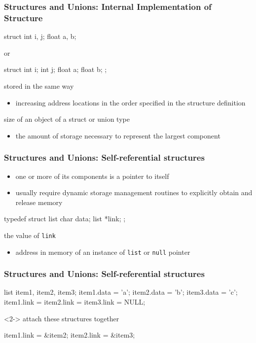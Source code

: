 \documentclass[newPxFont,sthlmFooter,nooffset]{beamer}
\begin{document}
\begin{frame}[t, fragile]
  \frametitle{Structures and Unions: {\large Internal Implementation of Structure}}
\begin{codedef}
struct {
    int i, j; float a, b;
}  
\end{codedef}

or 
\begin{codedef}
struct {
    int i; int j; float a; float b;
};
\end{codedef}
\bigskip
stored in the same way
\begin{itemize}
\item increasing address locations in the order specified in the
  structure definition
\end{itemize}

size of an object of a struct or union type
\begin{itemize}
\item the amount of storage necessary to represent the largest
  component
\end{itemize}

\end{frame}

\begin{frame}[t, fragile]
  \frametitle{Structures and Unions: {\large Self-referential structures}}
  \begin{itemize}
  \item one or more of its components is a pointer to itself
  \item usually require dynamic storage management routines to
    explicitly obtain and release memory
  \end{itemize}
\begin{codedef}
typedef struct list {
    char data;
    list *link;
};    
\end{codedef}
the value of \texttt{link}
\begin{itemize}
\item address in memory of an instance of \texttt{list} or \texttt{null} pointer
\end{itemize}
\end{frame}

\begin{frame}[t, fragile]
  \frametitle{Structures and Unions: {\large Self-referential structures}}
\begin{codedef}
list item1, item2, item3;
item1.data = 'a';
item2.data = 'b';
item3.data = 'c';
item1.link = item2.link = item3.link = NULL;   
\end{codedef}
\begin{uncoverenv}<2->
attach these structures together
\begin{codedef}
item1.link = &item2;
item2.link = &item3;
\end{codedef}
\end{uncoverenv}
\end{frame}
\end{document}
